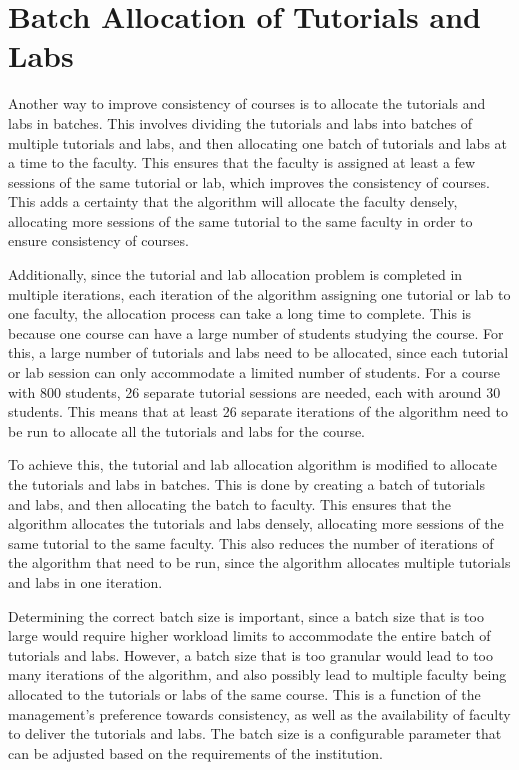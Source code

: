 \section{Batch Allocation of Tutorials and Labs}

Another way to improve consistency of courses is to allocate the tutorials and labs in batches. This involves dividing the tutorials and labs into batches of multiple tutorials and labs, and then allocating one batch of tutorials and labs at a time to the faculty. This ensures that the faculty is assigned at least a few sessions of the same tutorial or lab, which improves the consistency of courses. This adds a certainty that the algorithm will allocate the faculty densely, allocating more sessions of the same tutorial to the same faculty in order to ensure consistency of courses.

Additionally, since the tutorial and lab allocation problem is completed in multiple iterations, each iteration of the algorithm assigning one tutorial or lab to one faculty, the allocation process can take a long time to complete. This is because one course can have a large number of students studying the course. For this, a large number of tutorials and labs need to be allocated, since each tutorial or lab session can only accommodate a limited number of students. For a course with 800 students, 26 separate tutorial sessions are needed, each with around 30 students. This means that at least 26 separate iterations of the algorithm need to be run to allocate all the tutorials and labs for the course.

To achieve this, the tutorial and lab allocation algorithm is modified to allocate the tutorials and labs in batches. This is done by creating a batch of tutorials and labs, and then allocating the batch to faculty. This ensures that the algorithm allocates the tutorials and labs densely, allocating more sessions of the same tutorial to the same faculty. This also reduces the number of iterations of the algorithm that need to be run, since the algorithm allocates multiple tutorials and labs in one iteration.

Determining the correct batch size is important, since a batch size that is too large would require higher workload limits to accommodate the entire batch of tutorials and labs. However, a batch size that is too granular would lead to too many iterations of the algorithm, and also possibly lead to multiple faculty being allocated to the tutorials or labs of the same course. This is a function of the management's preference towards consistency, as well as the availability of faculty to deliver the tutorials and labs.  The batch size is a configurable parameter that can be adjusted based on the requirements of the institution.

